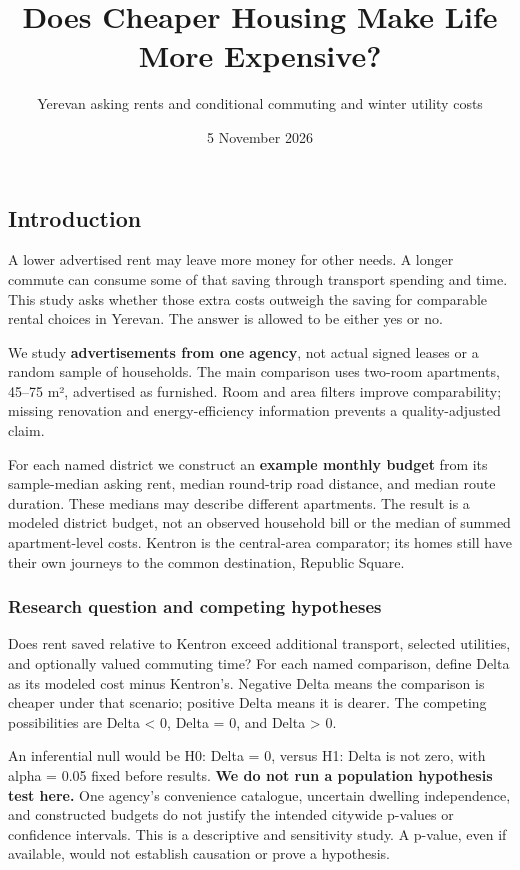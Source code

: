 \documentclass[
]{article}
\title{Does Cheaper Housing Make Life More Expensive?}
\subtitle{Yerevan asking rents and conditional commuting and winter
utility costs}
\author{}
\date{\vspace{-2.5em}5 November 2026}
\begin{document}
\maketitle

{
\setcounter{tocdepth}{2}
\tableofcontents
}
\subsection{Introduction}\label{introduction}

A lower advertised rent may leave more money for other needs. A longer
commute can consume some of that saving through transport spending and
time. This study asks whether those extra costs outweigh the saving for
comparable rental choices in Yerevan. The answer is allowed to be either
yes or no.

We study \textbf{advertisements from one agency}, not actual signed
leases or a random sample of households. The main comparison uses
two-room apartments, 45--75 m², advertised as furnished. Room and area
filters improve comparability; missing renovation and energy-efficiency
information prevents a quality-adjusted claim.

For each named district we construct an \textbf{example monthly budget}
from its sample-median asking rent, median round-trip road distance, and
median route duration. These medians may describe different apartments.
The result is a modeled district budget, not an observed household bill
or the median of summed apartment-level costs. Kentron is the
central-area comparator; its homes still have their own journeys to the
common destination, Republic Square.

\subsubsection{Research question and competing
hypotheses}\label{research-question-and-competing-hypotheses}

Does rent saved relative to Kentron exceed additional transport,
selected utilities, and optionally valued commuting time? For each named
comparison, define Delta as its modeled cost minus Kentron's. Negative
Delta means the comparison is cheaper under that scenario; positive
Delta means it is dearer. The competing possibilities are Delta
\textless{} 0, Delta = 0, and Delta \textgreater{} 0.

An inferential null would be H0: Delta = 0, versus H1: Delta is not
zero, with alpha = 0.05 fixed before results. \textbf{We do not run a
population hypothesis test here.} One agency's convenience catalogue,
uncertain dwelling independence, and constructed budgets do not justify
the intended citywide p-values or confidence intervals. This is a
descriptive and sensitivity study. A p-value, even if available, would
not establish causation or prove a hypothesis.
\end{document}
